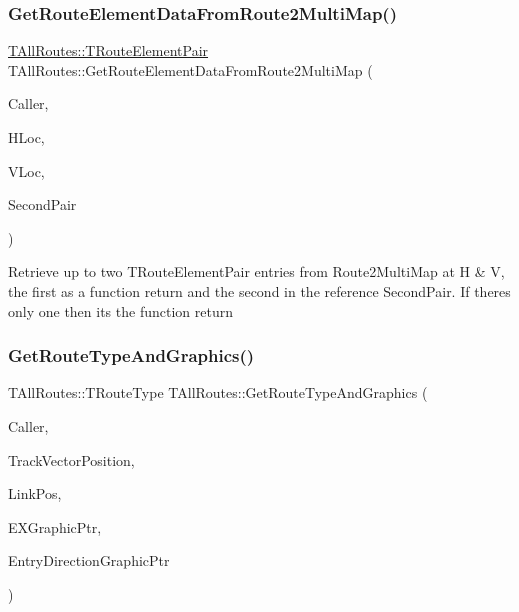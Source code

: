 \subsubsection{\texorpdfstring{Get\+Route\+Element\+Data\+From\+Route2\+Multi\+Map()}{GetRouteElementDataFromRoute2MultiMap()}}
{\footnotesize\ttfamily \mbox{\hyperlink{class_t_all_routes_a159a7d547e3d435d109a36cb41193a78}{T\+All\+Routes\+::\+T\+Route\+Element\+Pair}} T\+All\+Routes\+::\+Get\+Route\+Element\+Data\+From\+Route2\+Multi\+Map (\begin{DoxyParamCaption}\item[{int}]{Caller,  }\item[{int}]{H\+Loc,  }\item[{int}]{V\+Loc,  }\item[{\mbox{\hyperlink{class_t_all_routes_a159a7d547e3d435d109a36cb41193a78}{T\+All\+Routes\+::\+T\+Route\+Element\+Pair}} \&}]{Second\+Pair }\end{DoxyParamCaption})}

Retrieve up to two T\+Route\+Element\+Pair entries from Route2\+Multi\+Map at H \& V, the first as a function return and the second in the reference Second\+Pair. If there\textquotesingle{}s only one then it\textquotesingle{}s the function return \mbox{\label{class_t_all_routes_afbb161c646677f13755041b895a23982}} 
\subsubsection{\texorpdfstring{Get\+Route\+Type\+And\+Graphics()}{GetRouteTypeAndGraphics()}}
{\footnotesize\ttfamily T\+All\+Routes\+::\+T\+Route\+Type T\+All\+Routes\+::\+Get\+Route\+Type\+And\+Graphics (\begin{DoxyParamCaption}\item[{int}]{Caller,  }\item[{int}]{Track\+Vector\+Position,  }\item[{int}]{Link\+Pos,  }\item[{Graphics\+::\+T\+Bitmap $\ast$\&}]{E\+X\+Graphic\+Ptr,  }\item[{Graphics\+::\+T\+Bitmap $\ast$\&}]{Entry\+Direction\+Graphic\+Ptr }\end{DoxyParamCaption})}

